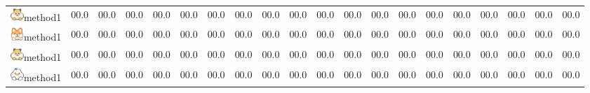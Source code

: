 \documentclass[letterpaper]{article} %
\begin{document}
\begin{table}[ht!]
{\begin{tabular}{ccccc ccccc ccccc  ccccc}
    \includegraphics[width=0.5cm]{image/mouse.png}method1  &\cellcolor{color1} 00.0 &\cellcolor{color1} 00.0 &\cellcolor{color2} 00.0 &\cellcolor{color1} 00.0 &\cellcolor{color3} 00.0 &\cellcolor{color1} 00.0 &\cellcolor{color1} 00.0 &\cellcolor{color1} 00.0 &\cellcolor{color1} 00.0 &\cellcolor{color3} 00.0 &\cellcolor{color3} 00.0 &\cellcolor{color1} 00.0
    &\cellcolor{color1} 00.0 &\cellcolor{color1} 00.0 &\cellcolor{color1} 00.0 &\cellcolor{color1} 00.0 &\cellcolor{color1} 00.0 &\cellcolor{color1} 00.0 &\cellcolor{color1} 00.0\\
        \includegraphics[width=0.5cm]{image/dog.png}method1  &\cellcolor{color1} 00.0 &\cellcolor{color1} 00.0 &\cellcolor{color2} 00.0 &\cellcolor{color1} 00.0 &\cellcolor{color3} 00.0 &\cellcolor{color1} 00.0 &\cellcolor{color1} 00.0 &\cellcolor{color1} 00.0 &\cellcolor{color1} 00.0 &\cellcolor{color1} 00.0 &\cellcolor{color1} 00.0 &\cellcolor{color1} 00.0
    &\cellcolor{color1} 00.0 &\cellcolor{color1} 00.0 &\cellcolor{color1} 00.0 &\cellcolor{color1} 00.0 &\cellcolor{color1} 00.0 &\cellcolor{color1} 00.0 &\cellcolor{color1} 00.0\\
        \includegraphics[width=0.5cm]{image/mouse.png}method1  &\cellcolor{color1} 00.0 &\cellcolor{color1} 00.0 &\cellcolor{color2} 00.0 &\cellcolor{color1} 00.0 &\cellcolor{color3} 00.0 &\cellcolor{color1} 00.0 &\cellcolor{color1} 00.0 &\cellcolor{color1} 00.0 &\cellcolor{color1} 00.0 &\cellcolor{color1} 00.0 &\cellcolor{color1} 00.0 &\cellcolor{color1} 00.0
    &\cellcolor{color1} 00.0 &\cellcolor{color1} 00.0 &\cellcolor{color1} 00.0 &\cellcolor{color1} 00.0 &\cellcolor{color1} 00.0 &\cellcolor{color1} 00.0 &\cellcolor{color1} 00.0\\
    \includegraphics[width=0.5cm]{image/duck.png}method1  &\cellcolor{color1} 00.0 &\cellcolor{color1} 00.0 &\cellcolor{color2} 00.0 &\cellcolor{color1} 00.0 &\cellcolor{color3} 00.0 &\cellcolor{color1} 00.0 &\cellcolor{color1} 00.0 &\cellcolor{color1} 00.0 &\cellcolor{color1} 00.0 &\cellcolor{color3} 00.0 &\cellcolor{color3} 00.0 &\cellcolor{color1} 00.0
    &\cellcolor{color1} 00.0 &\cellcolor{color1} 00.0 &\cellcolor{color1} 00.0 &\cellcolor{color1} 00.0 &\cellcolor{color1} 00.0 &\cellcolor{color1} 00.0 &\cellcolor{color1} 00.0\\

\end{tabular}}
\end{table}
\end{document}
